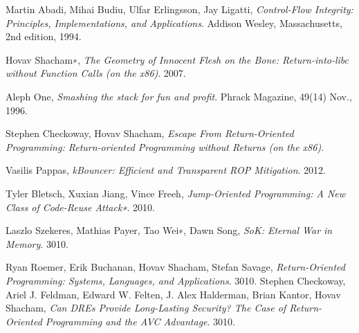 \documentclass[11pt]{amsart}
\begin{document}
\begin{thebibliography}{9}

  Martin Abadi, Mihai Budiu, Ulfar Erlingsson, Jay Ligatti,
  \emph{Control-Flow Integrity: Principles, Implementations, and Applications}.
  Addison Wesley, Massachusetts,
  2nd edition,
  1994.

  Hovav Shacham∗,
  \emph{The Geometry of Innocent Flesh on the Bone: Return-into-libc without Function Calls (on the x86)}.
  2007.

  Aleph One,
  \emph{Smashing the stack for fun and profit}.
  Phrack Magazine, 49(14) Nov.,
  1996.

  Stephen Checkoway, Hovav Shacham,
  \emph{Escape From Return-Oriented Programming: Return-oriented Programming without Returns (on the x86)}.

  Vasilis Pappas,
  \emph{kBouncer: Efficient and Transparent ROP Mitigation}.
  2012.

  Tyler Bletsch, Xuxian Jiang, Vince Freeh,
  \emph{Jump-Oriented Programming: A New Class of Code-Reuse Attack∗}.
  2010.

  Laszlo Szekeres, Mathias Payer, Tao Wei∗, Dawn Song,
  \emph{SoK: Eternal War in Memory}.
  3010.

  Ryan Roemer, Erik Buchanan, Hovav Shacham, Stefan Savage,
  \emph{Return-Oriented Programming: Systems, Languages, and Applications}.
  3010.
  Stephen Checkoway, Ariel J. Feldman, Edward W. Felten, J. Alex Halderman, Brian Kantor, Hovav Shacham,
  \emph{Can DREs Provide Long-Lasting Security? The Case of Return-Oriented Programming and the AVC Advantage}.
  3010.

\end{thebibliography}
\end{document}
